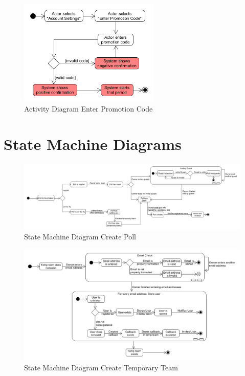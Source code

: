 \begin{appendices}
\begin{figure}[H]
    \centering
    \includegraphics[width=0.6\textwidth,keepaspectratio]{content/pictures/activity_diagrams/ActivityDiagram_EnterPromotionCode.png}
    \caption{Activity Diagram Enter Promotion Code}
	\label{fig:activity_diagram_enter_promotion_code}
\end{figure}

\newpage

\section{State Machine Diagrams}
\label{appendix:state_machine_diagrams}

\begin{figure}[H]
    \centering
    \includegraphics[width=1\textwidth,keepaspectratio]{content/pictures/state_diagrams/StateDiagram_CreatePoll.png}
    \caption{State Machine Diagram Create Poll}
	\label{fig:state_machine_diagram_create_poll}
\end{figure}

\begin{figure}[H]
    \centering
    \includegraphics[width=1\textwidth,keepaspectratio]{content/pictures/state_diagrams/StateDiagram_CreateTempTeam.png}
    \caption{State Machine Diagram Create Temporary Team}
	\label{fig:state_machine_diagram_create_temp_team}
\end{figure}


\end{appendices}
